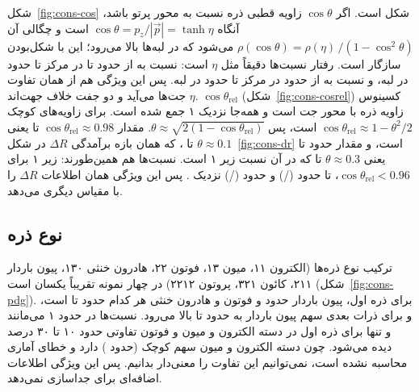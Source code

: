 شکل~\ref{fig:cons-cos} ‌شکل است. اگر $\cos\theta$ زاویه قطبی ذره نسبت به محور پرتو باشد، آنگاه $\cos\theta=p_z/|\vec p|=\tanh\eta$ است و چگالی آن $\rho(\cos\theta)=\rho(\eta)\,/(1-\cos^2\theta)$ می‌شود که در لبه‌ها بالا می‌رود؛ این با ‌شکل‌بودن سازگار است. رفتار نسبت‌ها دقیقاً مثل $\eta$ است: نسبت \Zjet به \bbbb از حدود  تا  در مرکز تا حدود  در لبه، و نسبت \ttZ به \ttbb از حدود  در مرکز تا حدود  در لبه. پس این ویژگی هم از همان تفاوت $\eta$ جت‌ها می‌آید و دو جفت خلاف جهت‌اند. $\cos\theta_\mathrm{rel}$ (شکل~\ref{fig:cons-cosrel}) کسینوس زاویه ذره با محور جت است و همه‌جا نزدیک ۱ جمع شده است. برای زاویه‌های کوچک $\cos\theta_\mathrm{rel}\approx1-\theta^2/2$ است، پس $\theta\approx\sqrt{2(1-\cos\theta_\mathrm{rel})}$. مقدار $\cos\theta_\mathrm{rel}\approx0.98$ تا  یعنی $\theta\approx0.1$ تا ، که همان بازه برآمدگی $\Delta R$ در شکل~\ref{fig:cons-dr} است، و مقدار حدود  تا  یعنی $\theta\approx0.3$ تا  که در آن نسبت زیر ۱ است. نسبت‌ها هم همین‌طورند: زیر ۱ برای $\cos\theta_\mathrm{rel}<0.96$، تا حدود  (\ttZ/\ttbb) و حدود  (\Zjet/\bbbb) نزدیک . پس این ویژگی همان اطلاعات $\Delta R$ را با مقیاس دیگری می‌دهد.

\subsection{نوع ذره}
ترکیب نوع ذره‌ها (الکترون ۱۱، میون ۱۳، فوتون ۲۲، هادرون خنثی ۱۳۰، پیون باردار ۲۱۱، کائون ۳۲۱، پروتون ۲۲۱۲) در چهار نمونه تقریباً یکسان است (شکل~\ref{fig:cons-pdg}). برای ذره اول، پیون باردار حدود  و فوتون و هادرون خنثی هر کدام حدود  تا  است، و برای ذرات بعدی سهم پیون باردار به حدود  تا  بالا می‌رود. نسبت‌ها در حدود ۱ می‌مانند و تنها برای ذره اول در دسته الکترون و میون و فوتون تفاوتی حدود ۱۰ تا ۳۰ درصد دیده می‌شود. چون دسته الکترون و میون سهم کوچک (حدود ) دارد و خطای آماری محاسبه نشده است، نمی‌توانیم این تفاوت را معنی‌دار بدانیم. پس این ویژگی اطلاعات اضافه‌ای برای جداسازی نمی‌دهد.

